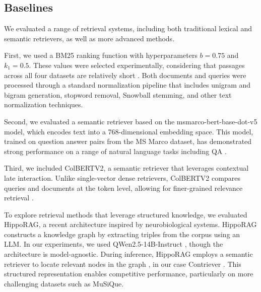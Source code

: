 

\subsection{Baselines}
\label{baselines_sec}

We evaluated a range of retrieval systems, including both traditional lexical and semantic retrievers, as well as more advanced methods.

\noindent First, we used a BM25 ranking function with hyperparameters $b = 0.75$ and $k_1 = 0.5$. These values were selected experimentally, considering that passages across all four datasets are relatively short \cite{10.1145/2682862.2682863}. Both  documents and queries were processed through a standard normalization pipeline that includes unigram and bigram generation, stopword removal, Snowball stemming, and other text normalization techniques.

\noindent Second, we evaluated a semantic retriever based on the msmarco-bert-base-dot-v5 model, which encodes text into a 768-dimensional embedding space. This model, trained on question answer pairs from the MS Marco dataset, has demonstrated strong performance on a range of natural language tasks including QA \cite{reimers-2019-sentence-bert}.

\noindent Third, we included ColBERTV2, a semantic retriever that leverages contextual late interaction. Unlike single-vector dense retrievers, ColBERTV2 compares queries and documents at the token level, allowing for finer-grained relevance retrieval \cite{santhanam-etal-2022-colbertv2}.

\noindent To explore retrieval methods that leverage structured knowledge, we evaluated HippoRAG, a recent architecture inspired by neurobiological systems. HippoRAG constructs a knowledge graph by extracting triples from the corpus using an LLM. In our experiments, we used QWen2.5-14B-Instruct \cite{qwen2}, though the architecture is model-agnostic. During inference, HippoRAG employs a semantic retriever to locate relevant nodes in the graph \cite{NEURIPS2024_6ddc001d}, in our case Contriever \cite{lei-etal-2023-unsupervised}. This structured representation enables competitive performance, particularly on more challenging datasets such as MuSiQue.

